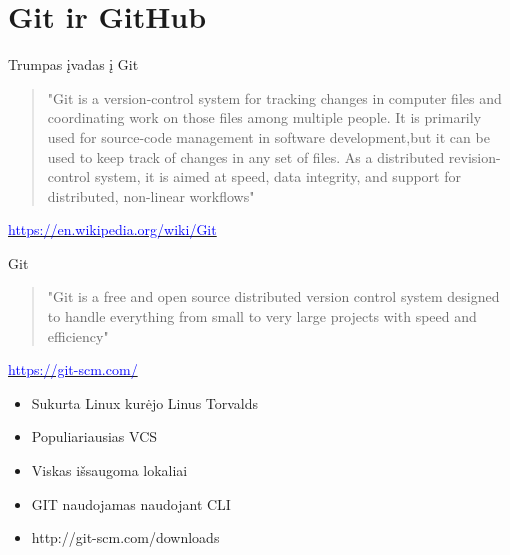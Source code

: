 \documentclass[11pt,xcolor=table]{beamer}
\begin{document}
\section{Git ir GitHub}
\begin{frame}{Trumpas įvadas į Git}
\begin{quote}
"Git is a version-control system for tracking changes in computer files and coordinating work on those files among multiple people. It is primarily used for source-code management in software development,but it can be used to keep track of changes in any set of files. As a distributed revision-control system, it is aimed at speed, data integrity, and support for distributed, non-linear workflows"
\end{quote}
\href{https://en.wikipedia.org/wiki/Git}{\textcolor{blue}{https://en.wikipedia.org/wiki/Git}}
\end{frame}
\begin{frame}{Git}
\begin{quote}
"Git is a free and open source distributed version control system designed to handle everything from small to very large projects with speed and efficiency"
\end{quote}
\href{https://git-scm.com/}{\textcolor{blue}{https://git-scm.com/}}
\begin{itemize}
\item Sukurta Linux kurėjo Linus Torvalds
\item Populiariausias VCS
\item Viskas išsaugoma lokaliai
\item GIT naudojamas naudojant CLI
\item http://git-scm.com/downloads
\end{itemize}
\end{frame}
\end{document}
